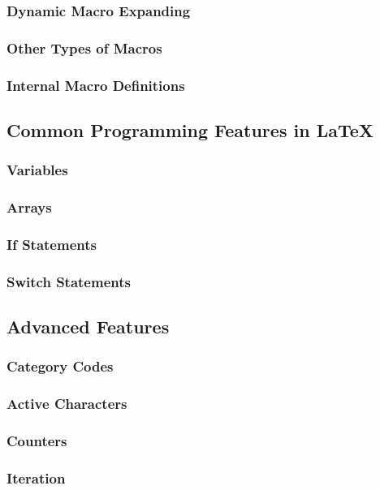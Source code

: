 \subsubsection{Dynamic Macro Expanding}
\subsubsection{Other Types of Macros}
\subsubsection{Internal Macro Definitions}

\subsection{Common Programming Features in LaTeX}
\subsubsection{Variables}
\subsubsection{Arrays}
\subsubsection{If Statements}
\subsubsection{Switch Statements}


\subsection{Advanced Features}\label{section:programming/advancedFeatures}
\subsubsection{Category Codes}
\subsubsection{Active Characters}
\subsubsection{Counters}
\subsubsection{Iteration}
